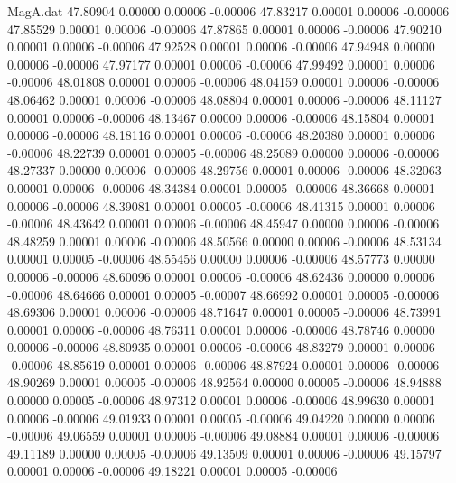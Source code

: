 \begin{filecontents}{MagA.dat}
  47.80904    0.00000    0.00006   -0.00006
  47.83217    0.00001    0.00006   -0.00006
  47.85529    0.00001    0.00006   -0.00006
  47.87865    0.00001    0.00006   -0.00006
  47.90210    0.00001    0.00006   -0.00006
  47.92528    0.00001    0.00006   -0.00006
  47.94948    0.00000    0.00006   -0.00006
  47.97177    0.00001    0.00006   -0.00006
  47.99492    0.00001    0.00006   -0.00006
  48.01808    0.00001    0.00006   -0.00006
  48.04159    0.00001    0.00006   -0.00006
  48.06462    0.00001    0.00006   -0.00006
  48.08804    0.00001    0.00006   -0.00006
  48.11127    0.00001    0.00006   -0.00006
  48.13467    0.00000    0.00006   -0.00006
  48.15804    0.00001    0.00006   -0.00006
  48.18116    0.00001    0.00006   -0.00006
  48.20380    0.00001    0.00006   -0.00006
  48.22739    0.00001    0.00005   -0.00006
  48.25089    0.00000    0.00006   -0.00006
  48.27337    0.00000    0.00006   -0.00006
  48.29756    0.00001    0.00006   -0.00006
  48.32063    0.00001    0.00006   -0.00006
  48.34384    0.00001    0.00005   -0.00006
  48.36668    0.00001    0.00006   -0.00006
  48.39081    0.00001    0.00005   -0.00006
  48.41315    0.00001    0.00006   -0.00006
  48.43642    0.00001    0.00006   -0.00006
  48.45947    0.00000    0.00006   -0.00006
  48.48259    0.00001    0.00006   -0.00006
  48.50566    0.00000    0.00006   -0.00006
  48.53134    0.00001    0.00005   -0.00006
  48.55456    0.00000    0.00006   -0.00006
  48.57773    0.00000    0.00006   -0.00006
  48.60096    0.00001    0.00006   -0.00006
  48.62436    0.00000    0.00006   -0.00006
  48.64666    0.00001    0.00005   -0.00007
  48.66992    0.00001    0.00005   -0.00006
  48.69306    0.00001    0.00006   -0.00006
  48.71647    0.00001    0.00005   -0.00006
  48.73991    0.00001    0.00006   -0.00006
  48.76311    0.00001    0.00006   -0.00006
  48.78746    0.00000    0.00006   -0.00006
  48.80935    0.00001    0.00006   -0.00006
  48.83279    0.00001    0.00006   -0.00006
  48.85619    0.00001    0.00006   -0.00006
  48.87924    0.00001    0.00006   -0.00006
  48.90269    0.00001    0.00005   -0.00006
  48.92564    0.00000    0.00005   -0.00006
  48.94888    0.00000    0.00005   -0.00006
  48.97312    0.00001    0.00006   -0.00006
  48.99630    0.00001    0.00006   -0.00006
  49.01933    0.00001    0.00005   -0.00006
  49.04220    0.00000    0.00006   -0.00006
  49.06559    0.00001    0.00006   -0.00006
  49.08884    0.00001    0.00006   -0.00006
  49.11189    0.00000    0.00005   -0.00006
  49.13509    0.00001    0.00006   -0.00006
  49.15797    0.00001    0.00006   -0.00006
  49.18221    0.00001    0.00005   -0.00006

\end{filecontents}
